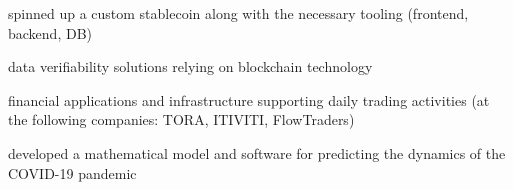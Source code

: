 

\vspace{2mm}
  \begin{cvitems} %
    \item {spinned up a custom stablecoin along with the necessary tooling (frontend, backend, DB)}
    \item {data verifiability solutions relying on blockchain technology}
    \item {financial applications and infrastructure supporting daily trading activities (at the following companies: TORA, ITIVITI, FlowTraders)}
    \item {developed a mathematical model and software for predicting the dynamics of the COVID-19 pandemic}
  \end{cvitems}
  \vspace{2mm}